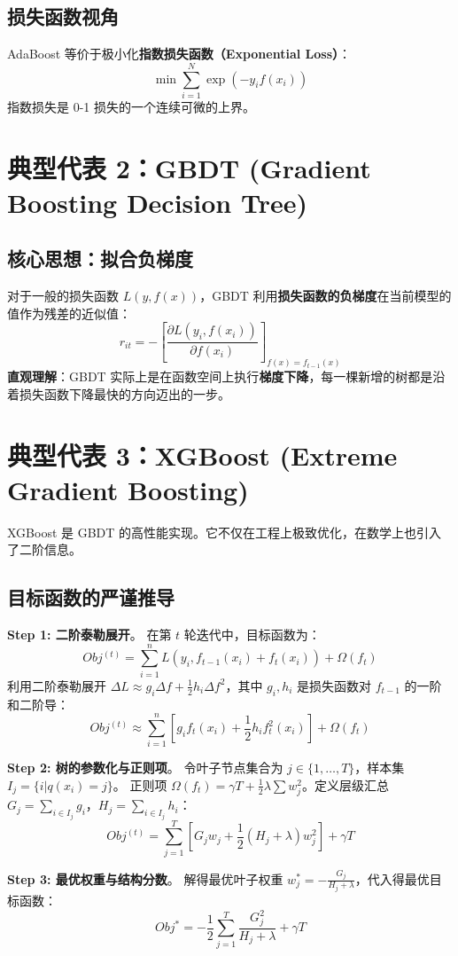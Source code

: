 \documentclass[12pt, a4paper]{book}
\begin{document}
\subsection{损失函数视角}
AdaBoost 等价于极小化\textbf{指数损失函数（Exponential Loss）}：
$$ \min \sum_{i=1}^N \exp(-y_i f(x_i)) $$
指数损失是 0-1 损失的一个连续可微的上界。

\section{典型代表 2：GBDT (Gradient Boosting Decision Tree)}

\subsection{核心思想：拟合负梯度}
对于一般的损失函数 $L(y, f(x))$，GBDT 利用\textbf{损失函数的负梯度}在当前模型的值作为残差的近似值：
$$ r_{it} = - \left[ \frac{\partial L(y_i, f(x_i))}{\partial f(x_i)} \right]_{f(x) = f_{t-1}(x)} $$
\textbf{直观理解}：GBDT 实际上是在函数空间上执行\textbf{梯度下降}，每一棵新增的树都是沿着损失函数下降最快的方向迈出的一步。

\section{典型代表 3：XGBoost (Extreme Gradient Boosting)}
XGBoost 是 GBDT 的高性能实现。它不仅在工程上极致优化，在数学上也引入了二阶信息。

\subsection{目标函数的严谨推导}
\textbf{Step 1: 二阶泰勒展开}。
在第 $t$ 轮迭代中，目标函数为：
$$ Obj^{(t)} = \sum_{i=1}^n L(y_i, f_{t-1}(x_i) + f_t(x_i)) + \Omega(f_t) $$
利用二阶泰勒展开 $\Delta L \approx g_i \Delta f + \frac{1}{2} h_i \Delta f^2$，其中 $g_i, h_i$ 是损失函数对 $f_{t-1}$ 的一阶和二阶导：
$$ Obj^{(t)} \approx \sum_{i=1}^n [g_i f_t(x_i) + \frac{1}{2} h_i f_t^2(x_i)] + \Omega(f_t) $$

\textbf{Step 2: 树的参数化与正则项}。
令叶子节点集合为 $j \in \{1,\dots,T\}$，样本集 $I_j = \{i | q(x_i)=j\}$。
正则项 $\Omega(f_t) = \gamma T + \frac{1}{2} \lambda \sum w_j^2$。定义层级汇总 $G_j = \sum_{i \in I_j} g_i$，$H_j = \sum_{i \in I_j} h_i$：
$$ Obj^{(t)} = \sum_{j=1}^T [G_j w_j + \frac{1}{2}(H_j + \lambda) w_j^2] + \gamma T $$

\textbf{Step 3: 最优权重与结构分数}。
解得最优叶子权重 $w_j^* = -\frac{G_j}{H_j + \lambda}$，代入得最优目标函数：
$$ Obj^* = -\frac{1}{2} \sum_{j=1}^T \frac{G_j^2}{H_j + \lambda} + \gamma T $$
\end{document}
